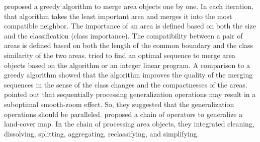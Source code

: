 \documentclass[ijgi,article,submit,moreauthors,pdftex]{Definitions/mdpi}
\begin{document}
 proposed a greedy algorithm 
to merge area objects one by one.
In each iteration, that algorithm takes the least important area and 
merges it into the most compatible neighbor.
The importance of an area is defined 
based on both the size and the classification (class importance).
The compatibility between a pair of areas is defined based on 
both the length of the common boundary and the class similarity
of the two areas. 
\citet[]{Peng2019Thesis} tried to find an optimal sequence 
to merge area objects
based on the \Astar algorithm or an integer linear program.
A comparison to a greedy algorithm showed that 
the \Astar algorithm improves the quality of the merging sequences
in the sense of the class changes and the compactnesses of the areas.
 pointed out that 
sequentially processing generalization operations 
may result in a suboptimal smooth-zoom effect.
So, they suggested that
the generalization operations should be paralleled.
\citet{Thiemann2018LandCover} proposed a chain of operators 
to generalize a land-cover map.
In the chain of processing area objects, 
they integrated cleaning, dissolving, splitting, aggregating, reclassifying, and simplifying. 
\end{document}

